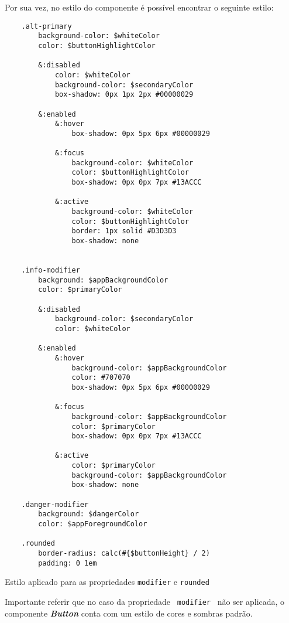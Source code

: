 Por sua vez, no estilo do componente é possível encontrar o seguinte estilo:

\begin{longlisting}
	\begin{verbatim}
	.alt-primary
		background-color: $whiteColor
		color: $buttonHighlightColor

		&:disabled
			color: $whiteColor
			background-color: $secondaryColor
			box-shadow: 0px 1px 2px #00000029

		&:enabled
			&:hover
				box-shadow: 0px 5px 6px #00000029

			&:focus
				background-color: $whiteColor
				color: $buttonHighlightColor
				box-shadow: 0px 0px 7px #13ACCC

			&:active
				background-color: $whiteColor
				color: $buttonHighlightColor
				border: 1px solid #D3D3D3
				box-shadow: none


	.info-modifier
		background: $appBackgroundColor
		color: $primaryColor

		&:disabled
			background-color: $secondaryColor
			color: $whiteColor

		&:enabled
			&:hover
				background-color: $appBackgroundColor
				color: #707070
				box-shadow: 0px 5px 6px #00000029

			&:focus
				background-color: $appBackgroundColor
				color: $primaryColor
				box-shadow: 0px 0px 7px #13ACCC

			&:active
				color: $primaryColor
				background-color: $appBackgroundColor
				box-shadow: none

	.danger-modifier
		background: $dangerColor
		color: $appForegroundColor

	.rounded
		border-radius: calc(#{$buttonHeight} / 2)
		padding: 0 1em
	\end{verbatim}

	\caption{Estilo aplicado para as propriedades \texttt{modifier} e \texttt{rounded}}
\end{longlisting}

Importante referir que no caso da propriedade ~\texttt{modifier}~ não ser aplicada, o componente \textbf{\textit{Button}} conta com um estilo de cores e sombras padrão.